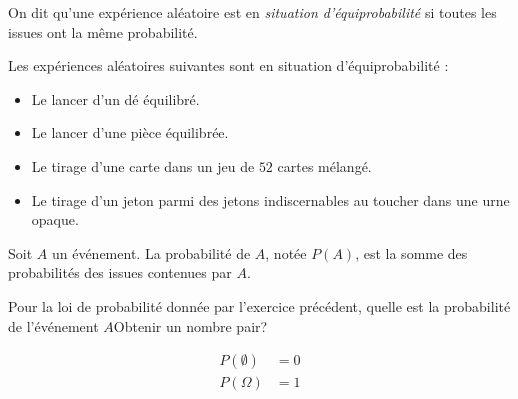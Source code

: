 \documentclass{article}
\begin{document}
\begin{definition}
On dit qu'une expérience aléatoire est en \emph{situation d'équiprobabilité} si toutes les issues ont la même probabilité.
\end{definition}
\begin{example}
Les expériences aléatoires suivantes sont en situation d'équiprobabilité :
\begin{itemize}
\item Le lancer d'un dé équilibré.
\item Le lancer d'une pièce équilibrée.
\item Le tirage d'une carte dans un jeu de $52$ cartes mélangé.
\item Le tirage d'un jeton parmi des jetons indiscernables au toucher dans une urne opaque.  
\end{itemize}
\end{example}
\begin{definitionbox}
Soit $A$ un événement. La probabilité de $A$, notée $P(A)$, est la somme des probabilités des issues contenues par $A$.
\end{definitionbox}
\begin{example}
Pour la loi de probabilité donnée par l'exercice précédent, quelle est la probabilité de l'événement $A$\og Obtenir un nombre pair\fg ?
\end{example}
\emptybox{3cm}
\begin{remark}
\begin{equation*}
\begin{aligned}
P(\emptyset) &= 0\\
P(\Omega) &= 1 
\end{aligned}
\end{equation*}
\end{remark}
\newpage
\end{document}

